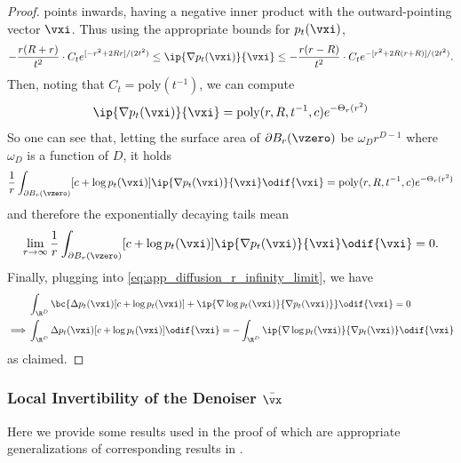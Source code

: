 \documentclass[../../book-main.tex]{subfiles}
\begin{document}
\begin{proof}
    points inwards, having a negative inner product with the
    outward-pointing vector \(\vxi\). Thus using the appropriate
    bounds for \(p_{t}(\vxi)\),
    \begin{equation}
        -\frac{r(R + r)}{t^{2}}\cdot C_{t}e^{[-r^{2} + 2Rr]/(2t^{2})}
        \leq \ip{\nabla p_{t}(\vxi)}{\vxi} \leq -\frac{r(r -
        R)}{t^{2}}\cdot C_{t}e^{-[r^{2} + 2R(r + R)]/(2t^{2})}.
    \end{equation}
    Then, noting that \(C_{t} = \mathrm{poly}(t^{-1})\), we can compute
    \begin{equation}
        [c + \log p_{t}(\vxi)]\ip{\nabla p_{t}(\vxi)}{\vxi} =
        \mathrm{poly}(r, R, t^{-1}, c)e^{-\Theta_{r}(r^{2})}
    \end{equation}
    So one can see that, letting the surface area of \(\partial
    B_{r}(\vzero)\) be \(\omega_{D} r^{D - 1}\) where \(\omega_{D}\)
    is a function of \(D\), it holds
    \begin{equation}
        \frac{1}{r}\int_{\partial B_{r}(\vzero)}[c + \log
        p_{t}(\vxi)]\ip{\nabla p_{t}(\vxi)}{\vxi}\odif{\vxi} =
        \mathrm{poly}(r, R, t^{-1}, c)e^{-\Theta_{r}(r^{2})}
    \end{equation}
    and therefore the exponentially decaying tails mean
    \begin{equation}
        \lim_{r \to \infty}\frac{1}{r}\int_{\partial B_{r}(\vzero)}[c
        + \log p_{t}(\vxi)]\ip{\nabla p_{t}(\vxi)}{\vxi}\odif{\vxi} = 0.
    \end{equation}
    Finally, plugging into \eqref{eq:app_diffusion_r_infinity_limit}, we have
    \begin{align}
        &\int_{\R^{D}}\bc{\Delta p_{t}(\vxi)[c + \log p_{t}(\vxi)] +
        \ip{\nabla \log p_{t}(\vxi)}{\nabla p_{t}(\vxi)}}\odif{\vxi} = 0 \\
        \implies
        &\int_{\R^{D}}\Delta p_{t}(\vxi)[c + \log
        p_{t}(\vxi)]\odif{\vxi} = -\int_{\R^{D}}\ip{\nabla \log
        p_{t}(\vxi)}{\nabla p_{t}(\vxi)}\odif{\vxi}
    \end{align}
    as claimed.
\end{proof}

\subsubsection{Local Invertibility of the Denoiser \(\bar{\vx}\)}

Here we provide some results used in the proof of
 which are appropriate
generalizations of corresponding results in \cite{Gribonval2011-pf}.
\end{document}
